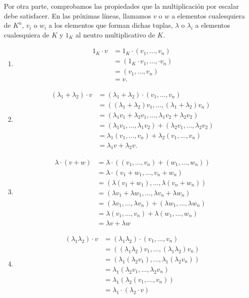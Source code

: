 Por otra parte, comprobamos las propiedades que la multiplicación por escalar debe satisfacer. En las próximas líneas, llamamos $v$ o $w$ a elementos cualesquiera de $K^n$, $v_i$ o $w_i$ a los elementos que forman dichas tuplas, $\lambda$ o $\lambda_i$ a elementos cualesquiera de $K$ y $1_K$ al neutro multiplicativo de $K$.
\begin{enumerate}[label=\alph*)]
	\item
	\begin{align*}
		1_K\cdot v &= 1_K\cdot(v_1,\dots,v_n)\\
		&= (1_K\cdot v_1,\dots,\cdot v_n)\\
		&= (v_1,\dots,v_n)\\
		&= v.
	\end{align*}
	\item
	\begin{align*}
		(\lambda_1 + \lambda_2)\cdot v &= (\lambda_1 + \lambda_2)\cdot(v_1,\dots,v_n)\\
		&= ((\lambda_1 + \lambda_2)v_1,\dots,(\lambda_1 + \lambda_2)v_n)\\
		&= (\lambda_1v_1 + \lambda_2v_1,\dots,\lambda_1v_2 + \lambda_2v_2)\\
		&= (\lambda_1v_1,\dots,\lambda_1v_2) + (\lambda_2v_1,\dots,\lambda_2v_2)\\
		&= \lambda_1(v_1,\dots,v_n) + \lambda_2(v_1,\dots,v_n)\\
		&= \lambda_1v + \lambda_2v.
	\end{align*}
	\item
	\begin{align*}
		\lambda\cdot(v + w) &= \lambda\cdot((v_1,\dots,v_n) + (w_1,\dots,w_n))\\
		&= \lambda\cdot(v_1+w_1,\dots,v_n+w_n)\\
		&= (\lambda(v_1+w_1),\dots,\lambda(v_n+w_n))\\
		&= (\lambda v_1+ \lambda w_1,\dots,\lambda v_n+\lambda w_n)\\
		&= (\lambda v_1, \dots, \lambda v_n) + (\lambda w_1, \dots, \lambda w_n)\\
		&= \lambda(v_1,\dots,v_n) + \lambda(w_1,\dots,w_n)\\
		&= \lambda v + \lambda w
	\end{align*}
	\item
	\begin{align*}
		(\lambda_1\lambda_2)\cdot v &= (\lambda_1\lambda_2)\cdot(v_1,\dots,v_n)\\
		&= ((\lambda_1\lambda_2)v_1,\dots,(\lambda_1\lambda_2)v_n)\\
		&= (\lambda_1(\lambda_2v_1),\dots,\lambda_1(\lambda_2v_n))\\
		&= \lambda_1(\lambda_2v_1,\dots,\lambda_2v_n)\\
		&= \lambda_1(\lambda_2(v_1,\dots,v_n))\\
		&= \lambda_1\cdot(\lambda_2\cdot v)
	\end{align*}
\end{enumerate}

